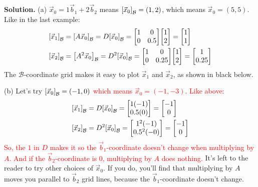 \documentclass[11pt, letterpaper]{report}
\newenvironment{book}{}{}
\let\originalleft\left
\let\originalright\right
\renewcommand{\left}{\mathopen{}\mathclose\bgroup\originalleft}
\renewcommand{\right}{\aftergroup\egroup\originalright}
\newcounter{example}[section]
\newcommand{\bbvec}[2]{
  \begin{bmatrix} #1 \\ #2 \end{bmatrix}
}
\newcommand{\vectorgrid}[1][]{%
  \pgfkeys{/vectorgrid/.cd, #1}%
  \clip (\vgxmin,\vgymin) rectangle (\vgxmax,\vgymax);

  \draw[step=\vgstep cm, gray, very thin] (\vgxmin,\vgymin) grid (\vgxmax,\vgymax);

  \draw[-] (\vgxmin,0) -- (\vgxmax,0);%
  \draw[-] (0,\vgymin) -- (0,\vgymax);%

  \pgfmathsetmacro{\bignum}{50}

  \foreach \k in {-20,...,20} {
    \pgfmathsetmacro{\px}{\k*\vgxv}
    \pgfmathsetmacro{\py}{\k*\vgyv}
    \pgfmathparse{abs(\px) <= abs(\vgxmax)*2+abs(\vgxmin)*2 && abs(\py) <= abs(\vgymax)*2+abs(\vgymin)*2 ? 1 : 0}
    \ifnum\pgfmathresult=1
      \draw[blue, very thin] ($(\px,\py) - \bignum*(\vgxu,\vgyu)$) -- ($(\px,\py) + \bignum*(\vgxu,\vgyu)$);
    \fi
  }

  \foreach \k in {-20,...,20} {
    \pgfmathsetmacro{\px}{\k*\vgxu}
    \pgfmathsetmacro{\py}{\k*\vgyu}
    \pgfmathparse{abs(\px) <= abs(\vgxmax)*2+abs(\vgxmin)*2 && abs(\py) <= abs(\vgymax)*2+abs(\vgymin)*2 ? 1 : 0}
    \ifnum\pgfmathresult=1
      \draw[blue, very thin] ($(\px,\py) - \bignum*(\vgxv,\vgyv)$) -- ($(\px,\py) + \bignum*(\vgxv,\vgyv)$);
    \fi
  }

  \draw[-Stealth, very thick, blue] (0,0) -- (\vgxu,\vgyu);%
  \draw[-Stealth, very thick, blue] (0,0) -- (\vgxv,\vgyv);%

  \pgfmathtruncatemacro{\intxmin}{ceil(\vgxmin)}
  \pgfmathtruncatemacro{\intxmax}{floor(\vgxmax)}
  \foreach \x in {\intxmin,...,\intxmax} {
    \pgfmathparse{mod(\x,\vglabint) == 0 && \x != 0 && \x != \vgxmin && \x != \vgxmax ? 1 : 0}
    \ifnum\pgfmathresult=1
      \draw (\x,0.1) -- (\x,-0.1) node[anchor=north,fill=white,inner sep=1pt] {\small$\x$};
    \fi
  }

  \pgfmathtruncatemacro{\intymin}{ceil(\vgymin)}
  \pgfmathtruncatemacro{\intymax}{floor(\vgymax)}
  \foreach \y in {\intymin,...,\intymax} {
    \pgfmathparse{mod(\y,\vglabint) == 0 && \y != 0 && \y != \vgymin && \y != \vgymax ? 1 : 0}
    \ifnum\pgfmathresult=1
      \draw (0.1,\y) -- (-0.1,\y) node[anchor=east,fill=white,inner sep=1pt] {\small$\y$};
    \fi
  }
}
\begin{document}
\begin{book}
\textbf{Solution.} (a) $\vec{x}_0=1\vec{b}_1+2\vec{b}_2$ means $\left[ \vec{x}_0 \right]_{\mathcal{B}} = (1,2)$, which means $\vec{x}_0=(5,5)$. Like in the last example:
\begin{align*}
\left[ \vec{x}_1 \right]_{\mathcal{B}} &= \left[ A\vec{x}_0 \right]_{\mathcal{B}} =
D\left[ \vec{x}_0 \right]_{\mathcal{B}} = \begin{bmatrix}
1 & 0 \\
0 & 0.5
\end{bmatrix}\bbvec{1}{2} = \bbvec{1}{1} \\
\left[ \vec{x}_2 \right]_{\mathcal{B}} &= \left[ A^2\vec{x}_0 \right]_{\mathcal{B}} =
D^2\left[ \vec{x}_0 \right]_{\mathcal{B}} = \begin{bmatrix}
1 & 0 \\
0 & 0.25
\end{bmatrix}\bbvec{1}{2} = \bbvec{1}{0.25}
\end{align*}
The $\mathcal{B}$-coordinate grid makes it easy to plot $\vec{x}_1$ and $\vec{x}_2$, as shown in black below.

(b) Let's try \textcolor{red}{$\left[ \vec{x}_0 \right]_{\mathcal{B}} = (-1,0)$ which means $\vec{x}_0=(-1,-3).$ Like above:
\begin{align*}
\left[ \vec{x}_1 \right]_{\mathcal{B}} &= 
D\left[ \vec{x}_0 \right]_{\mathcal{B}} = \bbvec{1(-1)}{0.5(0)} = \bbvec{-1}{0} \\
\left[ \vec{x}_2 \right]_{\mathcal{B}} &= 
D^2\left[ \vec{x}_0 \right]_{\mathcal{B}} = \bbvec{1^2(-1)}{0.5^2(-0)} = \bbvec{-1}{0}
\end{align*}
So, the $1$ in $D$ makes it so the $\vec{b}_1$-coordinate doesn't change when multiplying by $A$. And if the $\vec{b}_2$-coordinate is 0, multiplying by $A$ does nothing.}
It's left to the reader to try other choices of $\vec{x}_0$. If you do, you'll find that multiplying by $A$ moves you parallel to $\vec{b}_2$ grid lines, because the $\vec{b}_1$-coordinate doesn't change.

\end{book}
\end{document}
